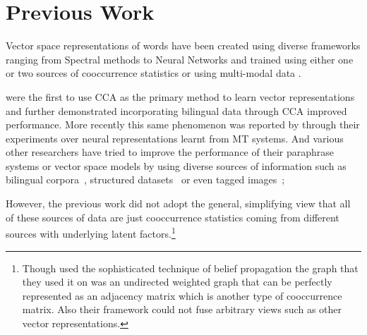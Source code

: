 \documentclass[11pt]{article}
\newcommand{\remove}[1]{}
\begin{document}
\section{Previous Work}
\label{sec:previouswork}
Vector space representations of words have been created using diverse
 frameworks ranging from Spectral methods
 \cite{dhillon2011multi,dhillon2012two}
 to Neural Networks
 \cite{mikolov2013linguistic,collobert2013word}
 and trained using either one
 \cite{pennington2014glove}
 or two sources of cooccurrence statistics
 \cite{zou2013bilingual,faruqui2014improving,bansal2014tailoring,levy2014dependency}
 or using multi-modal data
 \cite{felix2014learning,bruni2012distributional}.
 
\cite{dhillon2011multi,dhillon2012two} were the first to use
CCA as the primary method to learn vector representations and
\cite{faruqui2014improving} further demonstrated incorporating bilingual
data through CCA improved performance. More recently this same
phenomenon was reported by  through their
experiments over neural representations learnt from MT systems.
And various other researchers have tried to improve the
performance of their paraphrase systems or vector space models by using
diverse sources of information such as bilingual
corpora~\cite{bannard2005paraphrasing,Huang2012Improving,zou2013bilingual}, 
structured datasets~\cite{yu2014improving,faruqui2014retrofitting} or even
tagged images~\cite{bruni2012distributional}; 
\remove{The intuitive reason that using multiple sources of data improves performance is 
that the views complement each other. For example it was mentioned in
\cite{ganitkevitch2013ppdb} that monolingual data can't distinguish
between antonyms but bilingual data can. And bilingual data confounds
words that occur in the same sentence but monolingual data can
distinguish them based on their context.}
However, the previous
work did not adopt the general, simplifying view that 
all of these sources of data are just cooccurrence 
statistics coming from different sources with underlying latent
factors.\footnote{Though \cite{faruqui2014retrofitting} used
  the sophisticated technique of belief propagation the graph that
  they used it on was an undirected weighted graph that can be
  perfectly represented as an adjacency matrix which is another type of
cooccurrence matrix. Also their framework could not fuse arbitrary views such as
other vector representations.}
\end{document}
